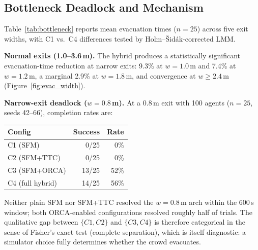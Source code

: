 \documentclass[a4paper,twoside]{article}
\begin{document}
\subsection{Bottleneck Deadlock and Mechanism}
\label{sec:bottleneck-evac}

Table~\ref{tab:bottleneck} reports mean evacuation times ($n=25$) across five exit widths, with C1 vs.\ C4 differences tested by Holm--\v{S}id\'ak-corrected LMM.

\textbf{Normal exits (1.0--3.6\,m).} The hybrid produces a statistically significant evacuation-time reduction at narrow exits: 9.3\% at $w=1.0$\,m and 7.4\% at $w=1.2$\,m, a marginal 2.9\% at $w=1.8$\,m, and convergence at $w\!\ge\!2.4$\,m (Figure~\ref{fig:evac_width}).

\textbf{Narrow-exit deadlock ($w=0.8$\,m).}
At a 0.8\,m exit with 100 agents ($n=25$, seeds 42--66), completion rates are:
\begin{center}\scriptsize
\begin{tabular}{@{}lrr@{}}
\toprule
\textbf{Config} & \textbf{Success} & \textbf{Rate} \\
\midrule
C1 (SFM)         & 0/25  & 0\% \\
C2 (SFM+TTC)     & 0/25  & 0\% \\
C3 (SFM+ORCA)    & 13/25 & 52\% \\
C4 (full hybrid) & 14/25 & 56\% \\
\bottomrule
\end{tabular}
\end{center}
Neither plain SFM nor SFM+TTC resolved the $w=0.8$\,m arch within the 600\,s window; both ORCA-enabled configurations resolved roughly half of trials. The qualitative gap between $\{C1, C2\}$ and $\{C3, C4\}$ is therefore categorical in the sense of Fisher's exact test (complete separation), which is itself diagnostic: a simulator choice fully determines whether the crowd evacuates.
\end{document}
